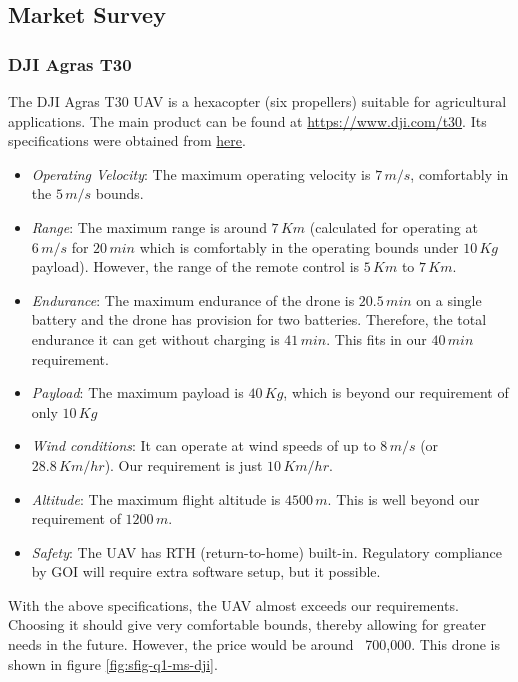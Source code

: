 \subsection{Market Survey}

\subsubsection*{DJI Agras T30}

The DJI Agras T30 UAV is a hexacopter (six propellers) suitable for agricultural applications. The main product can be found at \url{https://www.dji.com/t30}. Its specifications were obtained from \href{https://www.dji.com/t30/specs}{here}.

\begin{itemize}
    \item \textit{Operating Velocity}: The maximum operating velocity is $7\,m/s$, comfortably in the $5\,m/s$ bounds.
    \item \textit{Range}: The maximum range is around $7\,Km$ (calculated for operating at $6\,m/s$ for $20\,min$ which is comfortably in the operating bounds under $10\,Kg$ payload). However, the range of the remote control is $5\,Km$ to $7\,Km$.
    \item \textit{Endurance}: The maximum endurance of the drone is $20.5\,min$ on a single battery and the drone has provision for two batteries. Therefore, the total endurance it can get without charging is $41\,min$. This fits in our $40\,min$ requirement.
    \item \textit{Payload}: The maximum payload is $40\,Kg$, which is beyond our requirement of only $10\,Kg$
    \item \textit{Wind conditions}: It can operate at wind speeds of up to $8\,m/s$ (or $28.8\,Km/hr$). Our requirement is just $10\,Km/hr$.
    \item \textit{Altitude}: The maximum flight altitude is $4500\,m$. This is well beyond our requirement of $1200\,m$.
    \item \textit{Safety}: The UAV has RTH (return-to-home) built-in. Regulatory compliance by GOI will require extra software setup, but it possible.
\end{itemize}

With the above specifications, the UAV almost exceeds our requirements. Choosing it should give very comfortable bounds, thereby allowing for greater needs in the future.
However, the price would be around \rupee~700,000. This drone is shown in figure \ref{fig:sfig-q1-ms-dji}.

